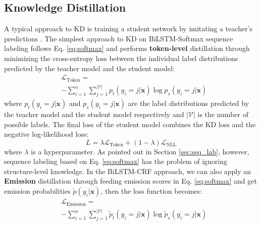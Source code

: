 \documentclass[11pt,a4paper]{article}
\newcommand{\xvec}{\mathbf{x}}
\newcommand{\mcL}{\mathcal{L}}
\newcommand{\mcV}{\mathcal{V}}
\begin{document}
\subsection{Knowledge Distillation}
A typical approach to KD is training a student network by imitating a teacher's predictions \cite{44873}. The simplest approach to KD on BiLSTM-Softmax sequence labeling follows Eq. \ref{eq:softmax} and performs \textbf{token-level} distillation through minimizing the cross-entropy loss between the individual label distributions predicted by the teacher model and the student model:
\begin{align}
&\mcL_{\text{Token}} = \nonumber\\
&- \sum\limits_{i=1}^{n} \sum\limits_{j=1}^{|\mcV|} p_t(y_{i}=j|\xvec) \log p_s(y_{i}=j|\xvec)  \label{eq:softmax-kd}
\end{align}
where $p_t(y_{i}=j|\mathbf{x})$ and $p_s(y_{i}=j|\mathbf{x})$ are the label distributions predicted by the teacher model and the student model respectively and $|\mcV|$ is the number of possible labels. The final loss of the student model combines the KD loss and the negative log-likelihood loss:
\begin{displaymath}
L = \lambda \mcL_{\text{Token}} + (1-\lambda) \mcL_{\text{NLL}}
\end{displaymath}
where $\lambda$ is a hyperparameter. As pointed out in Section \ref{sec:seq_lab}, however, sequence labeling based on Eq. \ref{eq:softmax} has the problem of ignoring structure-level knowledge.
In the BiLSTM-CRF approach, we can also apply an \textbf{Emission} distillation through feeding emission scores in Eq. \ref{eq:softmax} and get emission probabilities $\tilde{p}(y_i|\xvec)$, then the loss function becomes:
\begin{align}
&\mcL_{\text{Emission}} = \nonumber\\
& - \sum\limits_{i=1}^{n} \sum\limits_{j=1}^{|\mcV|} \tilde{p}_t(y_{i}=j|\xvec) \log \tilde{p}_s(y_{i}=j|\xvec) \label{eq:token-kd}
\end{align}
\end{document}

